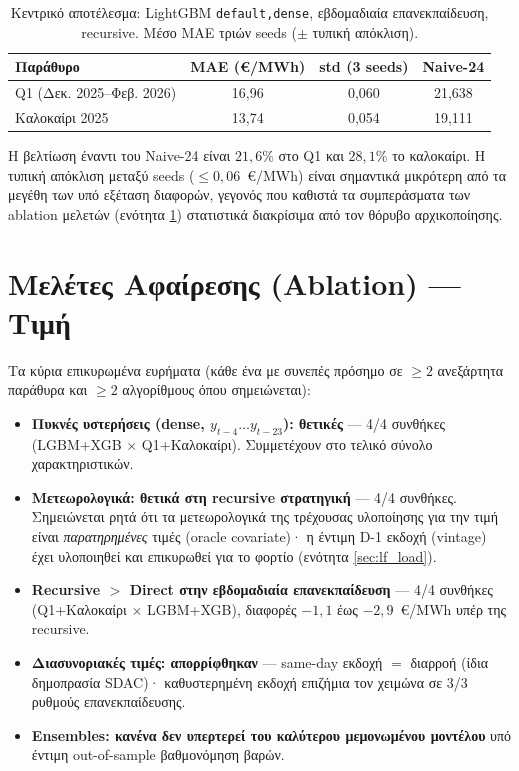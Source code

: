 \begin{table}[H]
  \centering
  \caption{Κεντρικό αποτέλεσμα: LightGBM \texttt{default,dense}, εβδομαδιαία
           επανεκπαίδευση, recursive. Μέσο MAE τριών seeds ($\pm$ τυπική απόκλιση).}
  \label{tab:lf_headline}
  \begin{tabular}{lccc}
    \toprule
    \textbf{Παράθυρο} & \textbf{MAE (€/MWh)} & \textbf{std (3 seeds)} & \textbf{Naive-24} \\
    \midrule
    Q1 (Δεκ. 2025--Φεβ. 2026) & 16{,}96 & 0{,}060 & 21{,}638 \\
    Καλοκαίρι 2025            & 13{,}74 & 0{,}054 & 19{,}111 \\
    \bottomrule
  \end{tabular}
\end{table}

Η βελτίωση έναντι του Naive-24 είναι $21{,}6\%$ στο Q1 και $28{,}1\%$ το
καλοκαίρι. Η τυπική απόκλιση μεταξύ seeds ($\leq 0{,}06$~€/MWh) είναι σημαντικά
μικρότερη από τα μεγέθη των υπό εξέταση διαφορών, γεγονός που καθιστά τα
συμπεράσματα των ablation μελετών (ενότητα \ref{sec:lf_ablation}) στατιστικά
διακρίσιμα από τον θόρυβο αρχικοποίησης.

\section{Μελέτες Αφαίρεσης (Ablation) --- Τιμή}
\label{sec:lf_ablation}

Τα κύρια επικυρωμένα ευρήματα (κάθε ένα με συνεπές πρόσημο σε $\geq 2$ ανεξάρτητα
παράθυρα και $\geq 2$ αλγορίθμους όπου σημειώνεται):

\begin{itemize}
  \item \textbf{Πυκνές υστερήσεις (dense, $y_{t-4}\dots y_{t-23}$): θετικές} ---
        4/4 συνθήκες (LGBM+XGB $\times$ Q1+Καλοκαίρι). Συμμετέχουν στο τελικό
        σύνολο χαρακτηριστικών.
  \item \textbf{Μετεωρολογικά: θετικά στη recursive στρατηγική} --- 4/4 συνθήκες.
        Σημειώνεται ρητά ότι τα μετεωρολογικά της τρέχουσας υλοποίησης για την
        τιμή είναι \emph{παρατηρημένες} τιμές (oracle covariate)· η έντιμη
        D-1 εκδοχή (vintage) έχει υλοποιηθεί και επικυρωθεί για το φορτίο
        (ενότητα \ref{sec:lf_load}).
  \item \textbf{Recursive $>$ Direct στην εβδομαδιαία επανεκπαίδευση} --- 4/4
        συνθήκες (Q1+Καλοκαίρι $\times$ LGBM+XGB), διαφορές $-1{,}1$ έως
        $-2{,}9$~€/MWh υπέρ της recursive.
  \item \textbf{Διασυνοριακές τιμές: απορρίφθηκαν} --- same-day εκδοχή
        $=$ διαρροή (ίδια δημοπρασία SDAC)· καθυστερημένη εκδοχή επιζήμια τον
        χειμώνα σε 3/3 ρυθμούς επανεκπαίδευσης.
  \item \textbf{Ensembles: κανένα δεν υπερτερεί του καλύτερου μεμονωμένου
        μοντέλου} υπό έντιμη out-of-sample βαθμονόμηση βαρών.
\end{itemize}

